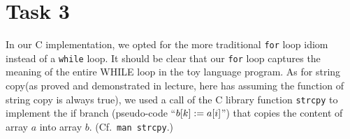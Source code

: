 \documentclass[a4paper,12pt,fleqn]{scrartcl}
\begin{document}
\section{Task 3}
\label{sec:task-3}


In our C implementation, we opted for the more traditional
\lstinline{for} loop idiom instead of a \lstinline{while} loop. It should be clear that our \lstinline{for} loop captures the meaning of the entire WHILE loop in the toy language program. As for string copy(as proved and demonstrated in lecture, here has assuming the function of string copy is always true), we used a call of the C library function \lstinline{strcpy} to implement the if branch (pseudo-code ``$b[k]\mathrel{:=} a[i]$'') that copies the content of array $a$ into array $b$. (Cf.~\lstinline{man strcpy}.)
\end{document}
